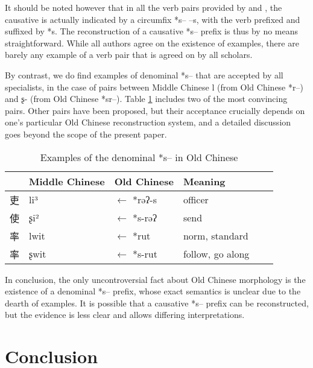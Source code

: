 \documentclass[oldfontcommands,oneside,a4paper,11pt]{article}
\newcommand{\ipa}[1]{{\phon \mbox{#1}}} %
\newcommand{\zh}[1]{{\cn #1}}
\begin{document}
It should be noted however that in all the verb pairs provided by \citealt{sagart99roc} and \citet{sagart12sprefix}, the causative is actually indicated by a circumfix *s-- --s, with the verb prefixed and suffixed by *s. The reconstruction of a causative *\ipa{s--} prefix is thus by no means straightforward. While all authors agree on the existence of examples, there are barely any example of a verb pair that is agreed on by all scholars.

 By contrast, we do find examples of denominal *\ipa{s--} that are accepted by all specialists, in the case of pairs between Middle Chinese \ipa{l} (from Old Chinese *\ipa{r--}) and \ipa{ʂ-} (from Old Chinese *\ipa{sr--}). Table \ref{tab:denom.oc} includes two of the most convincing pairs. Other pairs have been proposed, but their acceptance crucially depends on one's particular Old Chinese reconstruction system, and a detailed discussion goes beyond the scope of the present paper.  
  
  \begin{table}[h]
\caption{Examples of the denominal *\ipa{s--} in Old Chinese}\label{tab:denom.oc} \centering
\begin{tabular}{llllll}
\toprule 
  &Middle Chinese  &Old Chinese &Meaning \\
  \midrule
\zh{吏}& \ipa{li³} &$\leftarrow$ *\ipa{rəʔ-s}  & officer \\
\zh{使}& \ipa{ʂi²} &$\leftarrow$ *\ipa{s-rəʔ} &send  \\
\zh{率}& \ipa{lwit} &$\leftarrow$ *\ipa{rut} & norm, standard \\
\zh{率} &\ipa{ʂwit} &$\leftarrow$ *\ipa{s-rut} & follow, go along  \\
\bottomrule
\end{tabular}
\end{table}
 

 In conclusion, the only uncontroversial fact about Old Chinese morphology is the existence of a denominal *\ipa{s--} prefix, whose exact semantics is unclear due to the dearth of examples. It is possible that a causative *\ipa{s--} prefix can be reconstructed, but the evidence is less clear and allows differing interpretations.
  


\section{Conclusion}
\end{document}
